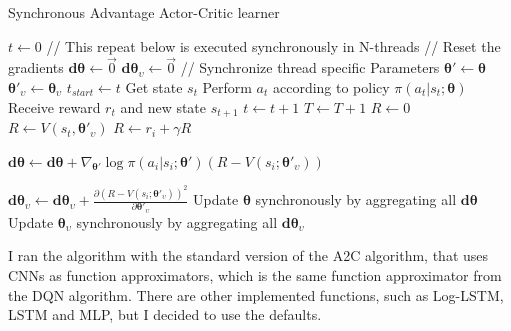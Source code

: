 \documentclass[11pt,twoside,a4paper]{article}
\begin{document}
\begin{algorithm}
  \caption{Synchronous Advantage Actor-Critic learner \label{alg:a2c-thread}}
  \begin{algorithmic}[1]
    \State $ t \leftarrow 0 $
    \State // This repeat below is executed synchronously in N-threads
    \Repeat
      \State // Reset the gradients
      \State $ \textbf{d}\boldsymbol{\theta} \leftarrow \vec{0} $
      \State $ \textbf{d}\boldsymbol{\theta}_{\upsilon} \leftarrow \vec{0} $
      \State // Synchronize thread specific Parameters
      \State $ \boldsymbol{\theta}' \leftarrow \boldsymbol{\theta} $
      \State $ \boldsymbol{\theta}'_{\upsilon} \leftarrow \boldsymbol{\theta}_{\upsilon} $
      \State $ t_{start} \leftarrow t $
      \State Get state $ s_{t} $
      \Repeat
        \State Perform $ a_{t} $ according to policy $ \pi(a_{t}|s_{t};\boldsymbol{\theta}) $
        \State Receive reward $ r_{t} $ and new state $ s_{t + 1} $
        \State $ t \leftarrow t + 1 $
        \State $ T \leftarrow T + 1 $
        \State $ R \leftarrow 0 $
      \Else
        \State $ R \leftarrow V(s_{t},\boldsymbol{\theta}'_{\upsilon}) $
      \EndIf
        \State $ R \leftarrow r_{i} + \gamma R $

        \State $ \textbf{d}\boldsymbol{\theta} \leftarrow \textbf{d}\boldsymbol{\theta}
        + \nabla_{\boldsymbol{\theta}'} \log{\pi(a_{i}|s_{i};\boldsymbol{\theta}')(R - V(s_{i};\boldsymbol{\theta}'_{\upsilon}))} $

        \State $ \textbf{d}\boldsymbol{\theta}_{\upsilon} \leftarrow \textbf{d}\boldsymbol{\theta}_{\upsilon}
        + \frac{\partial (R - V(s_{i};\boldsymbol{\theta}'_{\upsilon}))^{2}}{\partial \boldsymbol{\theta}'_{\upsilon}}$
      \EndFor
      \State Update $ \boldsymbol{\theta} $ synchronously by aggregating all $ \textbf{d}\boldsymbol{\theta} $
      \State Update $ \boldsymbol{\theta}_{\upsilon} $  synchronously by aggregating all $ \textbf{d}\boldsymbol{\theta}_{\upsilon} $
  \end{algorithmic}
\end{algorithm}

I ran the algorithm with the standard version of the A2C algorithm, that uses
CNNs as function approximators, which is the same function approximator from the
DQN algorithm. There are other implemented functions, such as Log-LSTM, LSTM and
MLP, but I decided to use the defaults.
\end{document}
